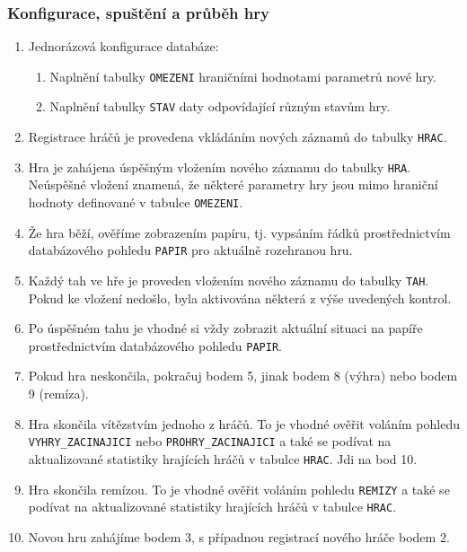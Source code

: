 \documentclass[
11pt,
a4paper,
pdftex,
czech,
titlepage
]{report}
\begin{document}
\subsubsection{Konfigurace, spuštění a průběh hry}
\begin{enumerate}
    \item Jednorázová konfigurace databáze:
    \begin{enumerate}
        \item Naplnění tabulky \texttt{OMEZENI} hraničními hodnotami parametrů nové hry.
        \item Naplnění tabulky \texttt{STAV} daty odpovídající různým stavům hry.
    \end{enumerate}
    \item Registrace hráčů je provedena vkládáním nových záznamů do tabulky \texttt{HRAC}.
    \item Hra je zahájena úspěšným vložením nového záznamu do tabulky \texttt{HRA}. Neúspěšné vložení znamená, že některé parametry hry jsou mimo hraniční hodnoty definované v tabulce \texttt{OMEZENI}.
    \item Že hra běží, ověříme zobrazením papíru, tj. vypsáním řádků prostřednictvím databázového pohledu \texttt{PAPIR} pro aktuálně rozehranou hru.
    \item Každý tah ve hře je proveden vložením nového záznamu do tabulky \texttt{TAH}. Pokud ke vložení nedošlo, byla aktivována některá z výše uvedených kontrol.
    \item Po úspěšném tahu je vhodné si vždy zobrazit aktuální situaci na papíře prostřednictvím databázového pohledu \texttt{PAPIR}.
    \item Pokud hra neskončila, pokračuj bodem 5, jinak bodem 8 (výhra) nebo bodem 9 (remíza).
    \item Hra skončila vítězstvím jednoho z hráčů. To je vhodné ověřit voláním pohledu \texttt{VYHRY\_ZACINAJICI} nebo \texttt{PROHRY\_ZACINAJICI} a také se podívat na aktualizované statistiky hrajících hráčů v tabulce \texttt{HRAC}. Jdi na bod 10.
    \item Hra skončila remízou. To je vhodné ověřit voláním pohledu \texttt{REMIZY} a také se podívat na aktualizované statistiky hrajících hráčů v tabulce \texttt{HRAC}.
    \item Novou hru zahájíme bodem 3, s případnou registrací nového hráče bodem 2.
\end{enumerate}
\end{document}
